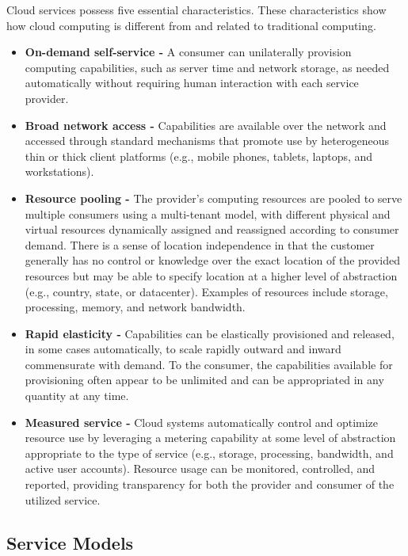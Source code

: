 \documentclass[a4paper,twoside,10pt]{report}
\begin{document}
Cloud services possess five essential characteristics. These characteristics show how cloud computing is different from and related to traditional computing.
\begin{itemize}
\item \textbf{On-demand self-service -} A consumer can unilaterally provision computing capabilities, such as server time and network storage, as needed automatically without requiring human interaction with each service provider.

\item \textbf{Broad network access -} Capabilities are available over the network and accessed through standard mechanisms that promote use by heterogeneous thin or thick client platforms (e.g., mobile phones, tablets, laptops, and workstations).

\item \textbf{Resource pooling -} The provider's computing resources are pooled to serve multiple consumers using a multi-tenant model, with different physical and virtual resources dynamically assigned and reassigned according to consumer demand. There is a sense of location independence in that the customer generally has no control or knowledge over the exact location of the provided resources but may be able to specify location at a higher level of abstraction (e.g., country, state, or datacenter). Examples of resources include storage, processing, memory, and network bandwidth.

\item \textbf{Rapid elasticity -} Capabilities can be elastically provisioned and released, in some cases automatically, to scale rapidly outward and inward commensurate with demand. To the consumer, the capabilities available for provisioning often appear to be unlimited and can be appropriated in any quantity at any time.

\item \textbf{Measured service -} Cloud systems automatically control and optimize resource use by leveraging a metering capability at some level of abstraction appropriate to the type of service (e.g., storage, processing, bandwidth, and active user accounts). Resource usage can be monitored, controlled, and reported, providing transparency for both the provider and consumer of the utilized service.
\end{itemize}

\subsection{Service Models}
\end{document}
